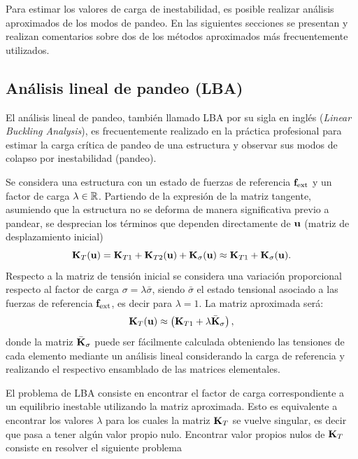 Para estimar los valores de carga de inestabilidad, es posible realizar análisis aproximados de los modos de pandeo. %
%
En las siguientes secciones se presentan y realizan comentarios sobre dos de los métodos aproximados más frecuentemente utilizados.

\subsection{Análisis lineal de pandeo (LBA)}

El análisis lineal de pandeo, también llamado LBA por su sigla en inglés (\textit{Linear Buckling Analysis}), es frecuentemente realizado en la práctica profesional para estimar la carga crítica de pandeo de una estructura y observar sus modos de colapso por inestabilidad (pandeo). %

Se considera una estructura con un estado de fuerzas de referencia ${\bf f}_{\text{ext}}$ y un factor de carga $\lambda \in {\mathbb R}$. %
%
Partiendo de la expresión de la matriz tangente, asumiendo que la estructura no se deforma de manera significativa previo a pandear, se desprecian los términos que dependen directamente de ${\bf u}$ (matriz de desplazamiento inicial)
%
\begin{equation}
{\bf K}_T ({\bf u}) = {\bf K}_{T1} + {\bf K}_{T2}({\bf u}) + {\bf K}_\sigma({\bf u}) \approx {\bf K}_{T1} + {\bf K}_\sigma({\bf u}).
\end{equation}
%
Respecto a la matriz de tensión inicial se considera una variación proporcional respecto al factor de carga $\sigma = \lambda \bar{\sigma}$, siendo $\bar{\sigma}$ el estado tensional asociado a las fuerzas de referencia ${\bf f}_{\text{ext}}$, es decir para $\lambda=1$. %
%
La matriz aproximada será:
%
\begin{equation}
{\bf K}_T({\bf u}) \approx \left( {\bf K}_{T1} + \lambda \bar{{\bf K}}_\sigma \right), 
\end{equation}
donde la matriz $\bar{{\bf K}}_\sigma$ puede ser fácilmente calculada obteniendo las tensiones de cada elemento mediante un análisis lineal considerando la carga de referencia y realizando el respectivo ensamblado de las matrices elementales. %
% 

El problema de LBA consiste en encontrar el factor de carga correspondiente a un equilibrio inestable utilizando la matriz aproximada. %
%
Esto es equivalente a encontrar los valores $\lambda$ para los cuales la matriz ${\bf K}_T$ se vuelve singular, es decir que pasa a tener algún valor propio nulo. %
%
Encontrar valor propios nulos de ${\bf K}_T$ consiste en resolver el siguiente problema

